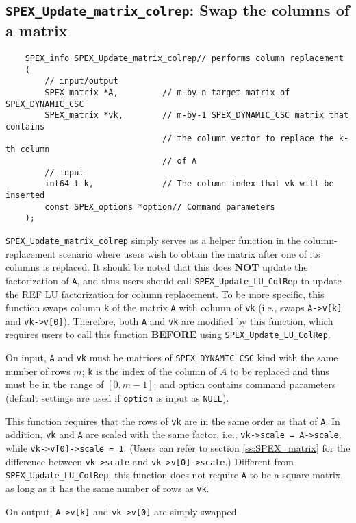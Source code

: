 \documentclass[12pt,oneside]{book}
\theoremstyle{definition}
\begin{document}
{\subsection{\texttt{SPEX\_Update\_matrix\_colrep}: Swap the columns of a matrix} \label{ss:SPEX_Update_matrix_colrep}
\begin{mdframed}[userdefinedwidth=\textwidth]
{\footnotesize
\begin{verbatim}
    SPEX_info SPEX_Update_matrix_colrep// performs column replacement
    (
        // input/output
        SPEX_matrix *A,         // m-by-n target matrix of SPEX_DYNAMIC_CSC
        SPEX_matrix *vk,        // m-by-1 SPEX_DYNAMIC_CSC matrix that contains
                                // the column vector to replace the k-th column
                                // of A
        // input
        int64_t k,              // The column index that vk will be inserted
        const SPEX_options *option// Command parameters
    );
\end{verbatim}
} \end{mdframed}

\verb|SPEX_Update_matrix_colrep| simply serves as a helper function in the column-replacement scenario where users wish to obtain the matrix after one of its columns is replaced. It should be noted that this does {\bf NOT} update the factorization of \verb|A|, and thus users should call \verb|SPEX_Update_LU_ColRep| to update the REF LU factorization for column replacement. To be more specific, this function swaps column \verb|k| of the matrix \verb|A| with column of \verb|vk| (i.e., swaps \verb|A->v[k]| and \verb|vk->v[0]|). Therefore, both \verb|A| and \verb|vk| are modified by this function, which requires users to call this function {\bf BEFORE} using \verb|SPEX_Update_LU_ColRep|.

On input, \verb|A| and \verb|vk| must be matrices of \verb|SPEX_DYNAMIC_CSC| kind with the same number of rows $m$; \verb|k| is the index of the column of $A$ to be replaced and thus must be in the range of $[0,m-1]$; and option contains command parameters (default settings are used if \verb|option| is input as \verb|NULL|).

This function requires that the rows of \verb|vk| are in the same order as that of \verb|A|. In addition, \verb|vk| and \verb|A|  are scaled with the same factor, i.e., \verb|vk->scale = A->scale|, while \verb|vk->v[0]->scale = 1|. (Users can refer to section \ref{ss:SPEX_matrix} for the difference between \verb|vk->scale| and \verb|vk->v[0]->scale|.) Different from \verb|SPEX_Update_LU_ColRep|, this function does not require \verb|A| to be a square matrix, as long as it has the same number of rows as \verb|vk|.

On output, \verb|A->v[k]| and \verb|vk->v[0]| are simply swapped. 
}
\end{document}
